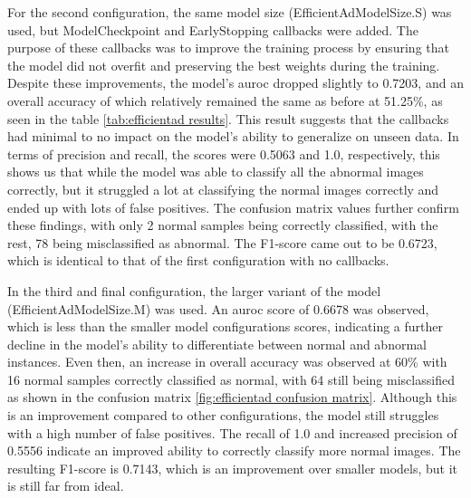 For the second configuration, the same model size (EfficientAdModelSize.S) was used, but ModelCheckpoint and EarlyStopping callbacks were added. The purpose of these callbacks was to improve the training process by ensuring that the model did not overfit and preserving the best weights during the training. Despite these improvements, the model's \gls{auroc} dropped slightly to 0.7203, and an overall accuracy of which relatively remained the same as before at 51.25\%, as seen in the table \ref{tab:efficientad results}. This result suggests that the callbacks had minimal to no impact on the model's ability to generalize on unseen data. In terms of precision and recall, the scores were 0.5063 and 1.0, respectively, this shows us that while the model was able to classify all the abnormal images correctly, but it struggled a lot at classifying the normal images correctly and ended up with lots of false positives. The confusion matrix values further confirm these findings, with only 2 normal samples being correctly classified, with the rest, 78 being misclassified as abnormal. The F1-score came out to be 0.6723, which is identical to that of the first configuration with no callbacks.

In the third and final configuration, the larger variant of the model (EfficientAdModelSize.M) was used. An \gls{auroc} score of 0.6678 was observed, which is less than the smaller model configurations scores, indicating a further decline in the model's ability to differentiate between normal and abnormal instances. Even then, an increase in overall accuracy was observed at 60\% with 16 normal samples correctly classified as normal, with 64 still being misclassified as shown in the confusion matrix \ref{fig:efficientad confusion matrix}. Although this is an improvement compared to other configurations, the model still struggles with a high number of false positives. The recall of 1.0 and increased precision of 0.5556 indicate an improved ability to correctly classify more normal images. The resulting F1-score is 0.7143, which is an improvement over smaller models, but it is still far from ideal.

